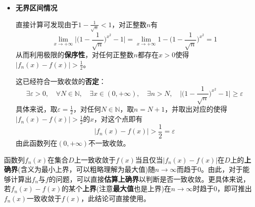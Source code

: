\documentclass[a4paper,UTF8,fontset=windows,AutoFakeBold]{ctexart}
\newcommand*{\note}{\noindent *}
\theoremstyle{ex}
\begin{document}
\begin{framed}
{\begin{itemize}
        \item \textbf{无界区间情况}
        
        直接计算可发现由于$1-\frac{1}{\sqrt{n}}<1$，对正整数$n$有
        $$\lim_{x\to+\infty}\bigg|\bigg(1-\frac{1}{\sqrt{n}}\bigg)^{x^2}-1\bigg|=\lim_{x\to+\infty}1-\bigg(1-\frac{1}{\sqrt{n}}\bigg)^{x^2}=1$$
        从而利用极限的\textbf{保序性}，对任何正整数$n$都存在$x>0$使得$|f_n(x)-f(x)|>\frac{1}{2}$。
        
        这已经符合一致收敛的\textbf{否定}：
        $$\exists\varepsilon>0,\quad\forall N\in\mathbb{N},\quad\exists x\in(0,+\infty),\quad\exists n>N,\quad\bigg|\bigg(1-\frac{1}{\sqrt{n}}\bigg)^{x^2}-1\bigg|\ge\varepsilon$$
        具体来说，取$\varepsilon=\frac{1}{2}$，对任何$N\in\mathbb{N}$，取$n=N+1$，并取出对应的使得$|f_n(x)-f(x)|>\frac{1}{2}$的$x$，对这个点即有
        $$|f_n(x)-f(x)|>\frac{1}{2}=\varepsilon$$
        由此函数列在$(0,+\infty)$不一致收敛。
    \end{itemize}
}
\end{framed}

\note 函数列$f_n(x)$在集合$D$上一致收敛于$f(x)$当且仅当$|f_n(x)-f(x)|$在$D$上的\textbf{上确界}(含义为最小上界，可以粗略理解为最大值)随$n\to\infty$而趋于0。由此，对于能够计算出$f_n$与$f$的问题，可以直接\textbf{估算上确界}以判断是否一致收敛。更具体来说，若$f_n(x)-f(x)$的某个\textbf{上界}(注意\textbf{最大值}也是上界)在$n\to\infty$时趋于0，即可推出$f_n(x)$一致收敛于$f(x)$，此结论可直接使用。
\end{document}
